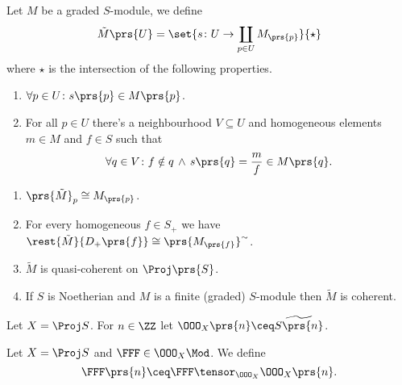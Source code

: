\documentclass[10pt,a4paper,twoside,openany,hidelinks]{book}
\begin{document}
\begin{definition}
Let $M$ be a graded $S$-module, we define
\[\tilde{M}\prs{U} = \set{s \colon U \to \coprod_{p \in U} M_{\prs{p}}}{\star}\]
where $\star$ is the intersection of the following properties.
\begin{enumerate}
\item $\forall p \in U \colon s\prs{p} \in M\prs{p}$.
\item For all $p \in U$ there's a neighbourhood $V \subseteq U$ and homogeneous elements $m \in M$ and $f \in S$ such that
\[\forall q \in V \colon f \notin q \, \wedge \, s\prs{q} = \frac{m}{f} \in M\prs{q} \text{.}\]
\end{enumerate}
\end{definition}

\begin{proposition}
\begin{enumerate}
\item $\prs{\tilde{M}}_p \cong M_{\prs{p}}$.
\item For every homogeneous $f \in S_+$ we have $\rest{\tilde{M}}{D_+\prs{f}} \cong \prs{M_{\prs{f}}}^\sim$.
\item $\tilde{M}$ is quasi-coherent on $\Proj\prs{S}$.
\item If $S$ is Noetherian and $M$ is a finite (graded) $S$-module then $\tilde{M}$ is coherent.
\end{enumerate}
\end{proposition}

\begin{definition}
Let $X = \Proj S$. For $n \in \ZZ$ let $\OOO_X\prs{n} \ceq \widetilde{S\prs{n}}$.
\end{definition}

\begin{definition}
Let $X = \Proj S$ and $\FFF \in \OOO_X\Mod$. We define
\[\FFF\prs{n} \ceq \FFF \tensor_{\OOO_X} \OOO_X\prs{n} \text{.}\]
\end{definition}
\end{document}
